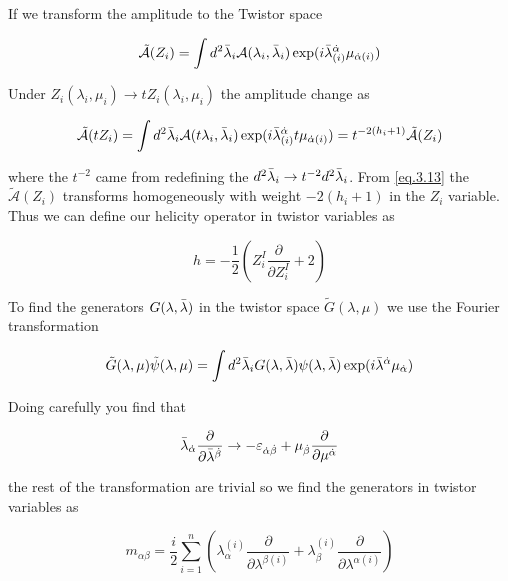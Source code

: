 If we transform the amplitude to the Twistor space 

\begin{equation}
\tilde{\mathcal{A}}(Z_{i}) = \int d^{2}\bar{\lambda}_{i}\mathcal{A}(\lambda_{i},\bar{\lambda}_{i}) \exp(i\bar{\lambda}^{\dot{\alpha}}_{(i)}\mu_{\dot{\alpha}(i)})  
\label{eq.3.12}
\end{equation}

Under $Z_{i}(\lambda_{i},\mu_{i}) \rightarrow tZ_{i}(\lambda_{i},\mu_{i}) $ the amplitude change as 

\begin{equation}
\tilde{\mathcal{A}}(tZ_{i}) = \int d^{2}\bar{\lambda}_{i}\mathcal{A}(t\lambda_{i},\bar{\lambda}_{i}) \exp(i\bar{\lambda}^{\dot{\alpha}}_{(i)}t\mu_{\dot{\alpha}(i)})   = t^{-2(h_{i}+1)}\tilde{\mathcal{A}}(Z_{i})
\label{eq.3.13}
\end{equation}

where the $t^{-2}$ came from redefining the $d^{2}\bar{\lambda}_{i} \rightarrow t^{-2}d^{2}\bar{\lambda}_{i}$. From \eqref{eq.3.13} the $\tilde{\mathcal{A}}(Z_{i})$ transforms homogeneously with weight $-2(h_{i}+1)$ in the $Z_{i}$ variable. Thus we can define our helicity operator in twistor variables as 

\begin{equation}
h = -\frac{1}{2}\left( Z^{I}_{i}\frac{\partial}{\partial Z_{i}^{I}} + 2 \right)
\end{equation}



To find the generators $G(\lambda,\bar{\lambda})$ in the twistor space $\tilde{G}(\lambda,\mu) $ we use the Fourier transformation

\begin{equation}
\tilde{G}(\lambda,\mu)  \tilde{\psi}(\lambda,\mu) = \int d^{2}\bar{\lambda}_{i}G(\lambda,\bar{\lambda})\psi(\lambda,\bar{\lambda}) \exp(i\bar{\lambda}^{\dot{\alpha}}_{}\mu_{\dot{\alpha}})  
\end{equation}


Doing carefully you find that 

\begin{equation}
\bar{\lambda}_{\dot{\alpha}} \frac{\partial}{\partial\bar{\lambda}^{\dot{\beta}}} \rightarrow - \varepsilon_{\dot{\alpha} \dot{\beta}} + \mu_{\dot{\beta}} \frac{\partial}{\partial\mu^{\dot{\alpha}}}
\end{equation}


the rest of the transformation are trivial so we find the generators in twistor variables as 


\begin{equation}
 m_{\alpha \beta} = \frac{i}{2} \sum_{i=1}^{n} \left(  \lambda_{\alpha}^{(i)} \frac{\partial}{\partial \lambda^{\beta(i)}}  + \lambda_{\beta}^{(i)} \frac{\partial}{\partial \lambda^{\alpha(i)}}  \right)
\end{equation}


